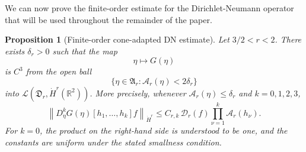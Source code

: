 \documentclass[12pt]{amsart}
\newtheorem{proposition}[theorem]{Proposition}
\theoremstyle{remark}
\theoremstyle{definition}
\numberwithin{equation}{section}
\newcommand{\R}{\mathbb{R}}
\begin{document}
We can now prove the finite-order estimate for the Dirichlet-Neumann operator that will be used throughout the remainder of the paper.

\begin{proposition}[Finite-order cone-adapted DN estimate]
\label{prop:finite-order-DN}
Let \(3/2<r<2\).
There exists \(\delta_r>0\) such that the map
\[
 \eta\longmapsto G(\eta)
\]
is \(C^3\) from the open ball
\[
 \{\eta\in\mathfrak A_r:\mathcal A_r(\eta)<2\delta_r\}
\]
into \(\mathcal L(\mathfrak D_r,\dot H^r(\R^2))\).
More precisely, whenever \(\mathcal A_r(\eta)\leq\delta_r\) and
\(k=0,1,2,3\),
\begin{equation}
\label{eq:finite-order-DN}
 \left\| D_\eta^kG(\eta)[h_1,\ldots,h_k]f \right\|_{\dot H^r} \leq C_{r,k}\, \mathcal D_r(f) \prod_{\nu=1}^k\mathcal A_r(h_\nu).
\end{equation}
For \(k=0\), the product on the right-hand side is understood to be one, and the constants are uniform under the stated smallness condition.
\end{proposition}
\end{document}
